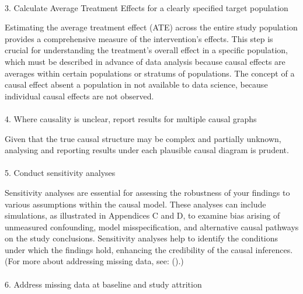 \documentclass[
  singlecolumn]{article}
\makeatletter
\let\oldparagraph\paragraph
\renewcommand{\paragraph}{
    \@ifstar
      \xxxParagraphStar
      \xxxParagraphNoStar
  }
\newcommand{\xxxParagraphStar}[1]{\oldparagraph*{#1}\mbox{}}
\newcommand{\xxxParagraphNoStar}[1]{\oldparagraph{#1}\mbox{}}
\makeatother
\begin{document}
\paragraph{3. Calculate Average Treatment Effects for a clearly
specified target
population}\label{calculate-average-treatment-effects-for-a-clearly-specified-target-population}

Estimating the average treatment effect (ATE) across the entire study
population provides a comprehensive measure of the intervention's
effects. This step is crucial for understanding the treatment's overall
effect in a specific population, which must be described in advance of
data analysis because causal effects are averages within certain
populations or stratums of populations. The concept of a causal effect
absent a population in not available to data science, because individual
causal effects are not observed.

\paragraph{4. Where causality is unclear, report results for multiple
causal
graphs}\label{where-causality-is-unclear-report-results-for-multiple-causal-graphs}

Given that the true causal structure may be complex and partially
unknown, analysing and reporting results under each plausible causal
diagram is prudent.

\paragraph{5. Conduct sensitivity
analyses}\label{conduct-sensitivity-analyses}

Sensitivity analyses are essential for assessing the robustness of your
findings to various assumptions within the causal model. These analyses
can include simulations, as illustrated in Appendices C and D, to
examine bias arising of unmeasured confounding, model misspecification,
and alternative causal pathways on the study conclusions. Sensitivity
analyses help to identify the conditions under which the findings hold,
enhancing the credibility of the causal inferences. (For more about
addressing missing data, see:
().)

\paragraph{6. Address missing data at baseline and study
attrition}\label{address-missing-data-at-baseline-and-study-attrition}
\end{document}

